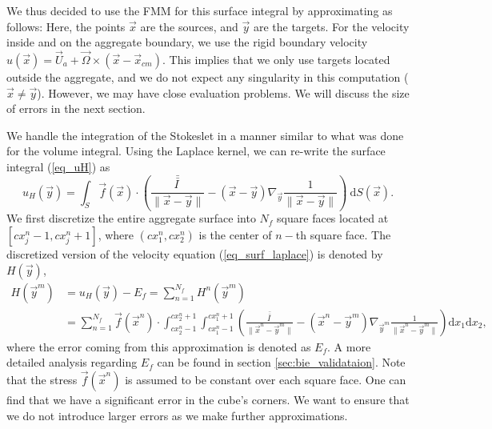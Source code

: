 We thus decided to use the FMM for this surface integral by approximating as follows:
Here, the points $\vec{x}$ are the sources, and $\vec{y}$ are the targets. 
For the velocity inside and on the aggregate boundary, we use the rigid boundary velocity $u(\vec{x}) = \vec{U}_a + \vec{\Omega} \times \left(\vec{x} - \vec{x}_{cm} \right)$. This implies that we only use targets located outside the aggregate, and we do not expect any singularity in this computation ($\vec{x} \neq \vec{y}$). However, we may have close evaluation problems. We will discuss the size of errors in the next section. 
\par
We handle the integration of the Stokeslet in a manner similar to what was done for the volume integral. 
Using the Laplace kernel, we can re-write the surface integral (\ref{eq_uH}) as
\begin{equation}
	u_H(\vec{y}) =
	\int_S 
	\vec{f}(\vec{x}) \cdot
  	\left(
  	\frac{\bar{\bar{I \ }}}{\|\vec{x} - \vec{y}\|}
  	- \left( \vec{x} - \vec{y} \right)
  	 \nabla_{\vec{y}}
  	\frac{1}{\|\vec{x} - \vec{y}\|}
  	\right)
	  \ \text{d} S(\vec{x}).
 \label{eq_surf_laplace}
\end{equation}
We first discretize the entire aggregate surface into $N_f$ square faces located at $[cx_j^n-1, cx^n_j+1]$, where $(cx^n_1, cx^n_2)$ is the center of $n-$th square face. The discretized version of the velocity equation (\ref{eq_surf_laplace}) is denoted by $H(\vec{y})$,
\begin{align}
	H(\vec{y}^m) & = u_H(\vec{y}) - E_f
	 = \sum_{n = 1}^{N_f} H^n(\vec{y}^m) 
	\nonumber \\
	& = \sum_{n = 1}^{N_f} 
	\vec{f}(\vec{x}^n) \cdot
	\int_{cx^n_2-1}^{cx^n_2+1} \int_{cx_1^n-1}^{cx_1^n+1}
  	\left(
  	\frac{\bar{\bar{I \ }}}{\|\vec{x}^n - \vec{y}^m\|}
  	- \left( \vec{x}^n - \vec{y}^m \right)
  	 \nabla_{\vec{y}^m}
  	\frac{1}{\|\vec{x}^n - \vec{y}^m\|}
  	\right)
	  \text{d} x_1  \text{d} x_2
	  ,
 \label{eq_surf_fmm_N_f}
\end{align}
where the error coming from this approximation is denoted as $E_f$. A more detailed analysis regarding $E_f$ can be found in section \ref{sec:bie_validataion}.
 Note that the stress $\vec{f}(\vec{x}^n)$ is assumed to be constant over each square face.  One can find that we have a significant error in the cube's corners. We want to ensure that we do not introduce larger errors as we make further approximations. 

